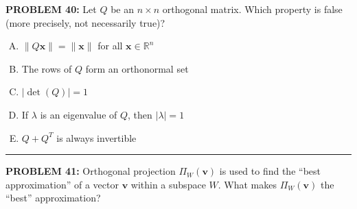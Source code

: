 \documentclass[12pt]{amsart}
\newcommand{\divider}{
  \vspace{-1em} %
  \noindent
  \raisebox{-0.15ex}{\textbullet}%
  \hspace{0.5em}%
  \rule[0.5ex]{0.95\textwidth}{1.0pt}%
  \hspace{0.5em}%
  \raisebox{-0.15ex}{\textbullet}%
  \vspace{0em} %
}
\begin{document}
{%
{\bf PROBLEM 40:}
% 
Let $Q$ be an $n \times n$ orthogonal matrix. 
Which property is false (more precisely, not necessarily true)?

\begin{enumerate}[(A)]
\item $\|Q\mathbf{x}\| = \|\mathbf{x}\|$ for all $\mathbf{x} \in \mathbb{R}^n$
\item The rows of $Q$ form an orthonormal set
\item $|\det(Q)| = 1$
\item If $\lambda$ is an eigenvalue of $Q$, then $|\lambda| = 1$
\item $Q + Q^T$ is always invertible
\end{enumerate}


\divider


\newpage


{\bf PROBLEM 41:}
% 
Orthogonal projection $\Pi_W(\mathbf{v})$ is used to find the ``best approximation'' of a vector $\mathbf{v}$ within a subspace $W$.
What makes $\Pi_W(\mathbf{v})$ the ``best'' approximation?

}
\end{document}
